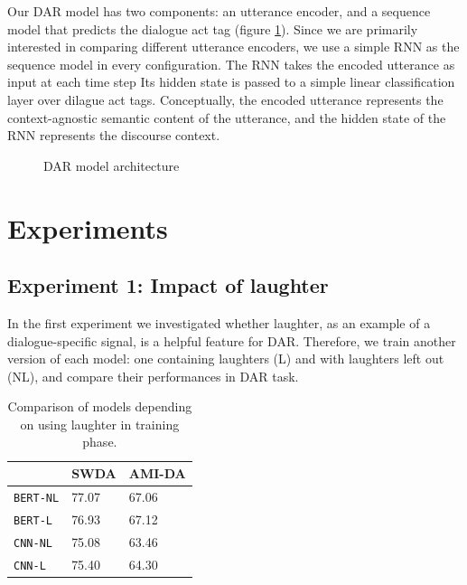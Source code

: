 \documentclass[11pt,a4paper]{article}
\begin{document}
Our DAR model has two components: an utterance encoder, and a sequence model that predicts the dialogue act tag (figure \ref{fig:model-architecture}).
Since we are primarily interested in comparing different utterance encoders, we use a simple RNN as the sequence model in every configuration. 
The RNN takes the encoded utterance as input at each time step
Its hidden state is passed to a simple linear classification layer over dilague act tags.
Conceptually, the encoded utterance represents the context-agnostic semantic content of the utterance, and the hidden state of the RNN represents the discourse context.

\begin{figure}
  
  \caption{DAR model architecture}
  \label{fig:model-architecture}
\end{figure}

\section{Experiments}
\subsection{Experiment 1: Impact of laughter}   %
In the first experiment we investigated whether laughter, as an example of a dialogue-specific signal, is a helpful feature for DAR.
Therefore, we train another version of each model: one containing laughters (L) and with laughters left out (NL), and compare their performances in DAR task.

\begin{table}
  \centering
  \begin{tabular}{@{}lll@{}}
    \toprule
                      & SWDA  & AMI-DA \\ \midrule
    \texttt{BERT-NL}  & 77.07 & 67.06       \\ 
    \texttt{BERT-L}   & 76.93 & 67.12       \\ \midrule
    \texttt{CNN-NL}   & 75.08 & 63.46        \\
    \texttt{CNN-L}    & 75.40 & 64.30        \\ \bottomrule
    
  \end{tabular}
  \caption{Comparison of models depending on using laughter in training phase.}
\end{table}
\end{document}
